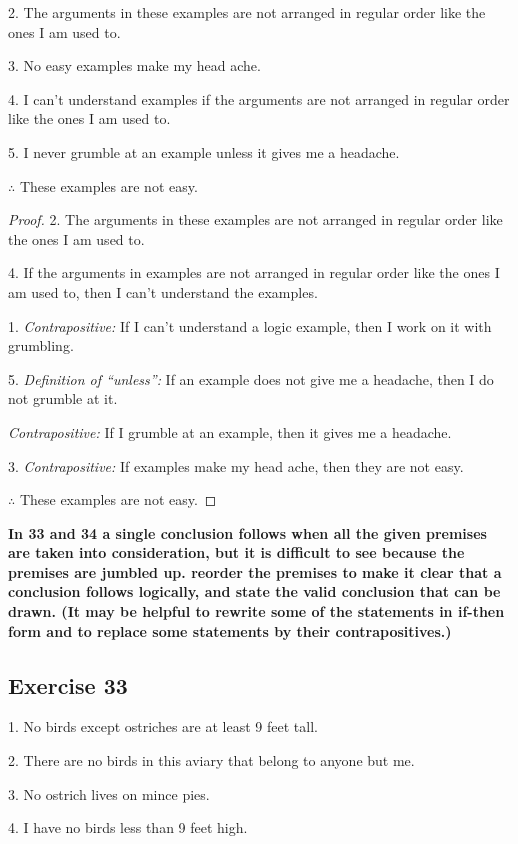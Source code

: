 \documentclass[14pt]{extarticle}
\begin{document}
2. The arguments in these examples are not arranged in regular order like the ones I am used to.

3. No easy examples make my head ache.

4. I can’t understand examples if the arguments are not arranged in regular order like the ones I am used to.

5. I never grumble at an example unless it gives me a headache.

$\therefore$ These examples are not easy.

\begin{proof}
    2. The arguments in these examples are not arranged in regular order like the ones I am used to.

    4. If the arguments in examples are not arranged in regular order like the ones I am used to, then I can’t understand the examples.

    1. {\it Contrapositive:} If I can't understand a logic example, then I work on it with grumbling.

    5. {\it Definition of ``unless'':} If an example does not give me a headache, then I do not grumble at it.

        {\it Contrapositive:} If I grumble at an example, then it gives me a headache.

    3. {\it Contrapositive:} If examples make my head ache, then they are not easy.

    $\therefore$ These examples are not easy.
\end{proof}

{\bf \color{cyan} In 33 and 34 a single conclusion follows when all the given premises are taken into consideration, but it is difficult to see because the premises are jumbled up. reorder the premises to make it clear that a conclusion follows logically, and state the valid conclusion that can be drawn. (It may be helpful to rewrite some of the statements in if-then form and to replace some statements by their contrapositives.)}

\subsection{Exercise 33}
1. No birds except ostriches are at least 9 feet tall.

2. There are no birds in this aviary that belong to anyone but me.

3. No ostrich lives on mince pies.

4. I have no birds less than 9 feet high.
\end{document}
